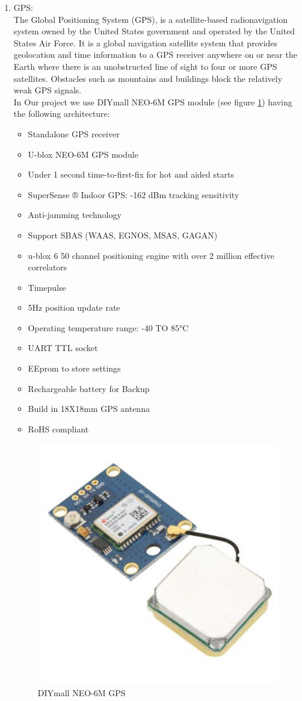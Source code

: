 \begin{enumerate}
   \item GPS: \\
   The Global Positioning System (GPS), is a satellite-based radionavigation system owned by the United States government and operated by the United States Air Force. It is a global navigation satellite system that provides geolocation and time information to a GPS receiver anywhere on or near the Earth where there is an unobstructed line of sight to four or more GPS satellites. Obstacles such as mountains and buildings block the relatively weak GPS signals. \cite{web009}\\
   In Our project we use DIYmall NEO-6M GPS module (see figure \ref{fig:neo_6m}) having the following architecture:
    \begin{itemize}
        \item Standalone GPS receiver
        \item U-blox NEO-6M GPS module 
        \item Under 1 second time-to-first-fix for hot and aided starts
        \item SuperSense ® Indoor GPS: -162 dBm tracking sensitivity
        \item Anti-jamming technology
        \item Support SBAS (WAAS, EGNOS, MSAS, GAGAN)
        \item u-blox 6 50 channel positioning engine with over 2 million effective correlators
        \item Timepulse
        \item 5Hz position update rate
        \item Operating temperature range: -40 TO 85°C
        \item UART TTL socket 
        \item EEprom to store settings
        \item Rechargeable battery for Backup 
        \item Build in 18X18mm GPS antenna 
        \item RoHS compliant 
    \end{itemize}{}
     \begin{figure}[H]%
    \center%
    \includegraphics[width=.5\textwidth]
    {images/Alzahraa/gps_NEO_6M.jpg}%
    \caption[GPS NEO]{DIYmall NEO-6M GPS}\label{fig:neo_6m}%
  \end{figure}
   

\end{enumerate}
